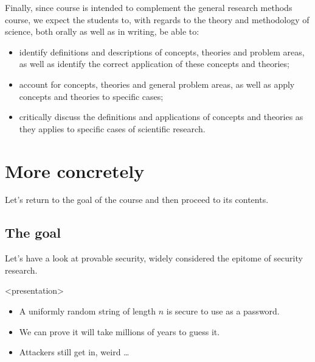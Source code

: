 Finally, since course is intended to complement the general research methods 
course, we expect the students to, with regards to the theory and  methodology 
of science, both orally as well as in writing, be able to:
\begin{itemize}
  \item identify definitions and descriptions of concepts, theories and problem 
    areas, as well as identify the correct application of these concepts and 
    theories;
  \item account for concepts, theories and general problem areas, as well as 
    apply concepts and theories to specific cases;
  \item critically discuss the definitions and applications of concepts and 
    theories as they applies to specific cases of scientific research.
\end{itemize}


\section{More concretely}

Let's return to the goal of the course and then proceed to its contents.

\subsection{The goal}

Let's have a look at provable security, widely considered the epitome of 
security research.

\begin{frame}<presentation>
  \begin{example}
    \begin{itemize}
      \item A uniformly random string of length \(n\) is secure to use as a 
        password.

      \item We can prove it will take millions of years to guess it.
    \end{itemize}
  \end{example}

  \pause

  \begin{remark}
    \begin{itemize}
      \item Attackers still get in, weird \dots
    \end{itemize}
  \end{remark}
\end{frame}

